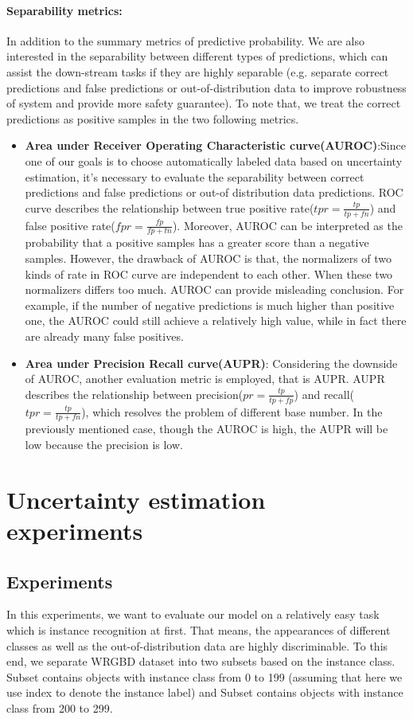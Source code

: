 \paragraph{Separability metrics:} In addition to the summary metrics of predictive probability. We are also interested in the separability between different types of predictions, which can assist the down-stream tasks if they are highly separable (e.g. separate correct predictions and false predictions or out-of-distribution data to improve robustness of system and provide more safety guarantee). To note that, we treat the correct predictions as positive samples in the two following metrics.
\begin{itemize}
	\item \textbf{Area under Receiver Operating Characteristic curve(AUROC)}:Since one of our goals is to choose automatically labeled data based on uncertainty estimation, it's necessary to evaluate the separability between correct predictions and false predictions or out-of distribution data predictions. ROC curve describes the relationship between true positive rate($tpr=\frac{tp}{tp+fn}$) and false positive rate($fpr=\frac{fp}{fp+tn}$). Moreover, AUROC can be interpreted as the probability that a positive samples has a greater score than a negative samples. However, the drawback of AUROC is that, the normalizers of two kinds of rate in ROC curve are independent to each other. When these two normalizers differs too much. AUROC can provide misleading conclusion. For example, if the number of negative predictions is much higher than positive one, the AUROC could still achieve a relatively high value, while in fact there are already many false positives. 
	
	\item \textbf{Area under Precision Recall curve(AUPR)}: Considering the downside of AUROC, another evaluation metric is employed, that is AUPR. AUPR describes the relationship between precision($pr = \frac{tp}{tp+fp}$) and recall($tpr=\frac{tp}{tp+fn}$), which resolves the problem of different base number. In the previously mentioned case, though the AUROC is high, the AUPR will be low because the precision is low. 
\end{itemize}


\section{Uncertainty estimation experiments}

\subsection{Experiments }
In this experiments, we want to evaluate our model on a relatively easy task which is instance recognition at first. That means, the appearances of different classes as well as the out-of-distribution data are highly discriminable. To this end, we separate WRGBD dataset into two subsets based on the instance class. Subset  contains objects with instance class from 0 to 199 (assuming that here we use index to denote the instance label) and Subset  contains objects with instance class from 200 to 299. 


